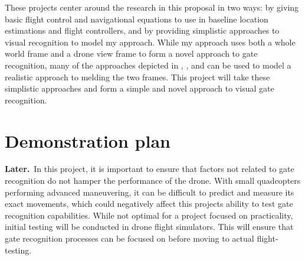 \documentclass[onecolumn,10pt]{IEEEtran}
\newcommand{\Later}{\textbf{Later.}}
\begin{document}
These projects center around the research in this proposal in two ways: by giving basic flight control and navigational equations to use in baseline location estimations and flight controllers, and by providing simplistic approaches to visual recognition to model my approach. While my approach uses both a whole world frame and a drone view frame to form a novel approach to gate recognition, many of the approaches depicted in \cite{zhilenkov2018use}, \cite{jung2018perception}, and \cite{jung2018direct} can be used to model a realistic approach to melding the two frames. This project will take these simplistic approaches and form a simple and novel approach to visual gate recognition.








\section{Demonstration plan}

\Later\ In this project, it is important to ensure that factors not related to gate recognition do not hamper the performance of the drone. With small quadcopters performing advanced maneuvering, it can be difficult to predict and measure its exact movements, which could negatively affect this projects ability to test gate recognition capabilities. While not optimal for a project focused on practicality, initial testing will be conducted in drone flight simulators. This will ensure that gate recognition processes can be focused on before moving to actual flight-testing.
\end{document}
